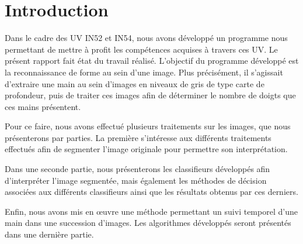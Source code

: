 \section*{Introduction}
Dans le cadre des UV IN52 et IN54, nous avons développé un programme nous permettant de mettre à profit les compétences acquises à travers ces UV. Le présent rapport fait état du travail réalisé. L'objectif du programme développé est la reconnaissance de forme au sein d'une image. Plus précisément, il s'agissait d'extraire une main au sein d'images en niveaux de gris de type carte de profondeur, puis de traiter ces images afin de déterminer le nombre de doigts que ces mains présentent.

Pour ce faire, nous avons effectué plusieurs traitements sur les images, que nous présenterons par parties. La première s’intéresse aux différents traitements effectués afin de segmenter l’image originale pour permettre son interprétation.

Dans une seconde partie, nous présenterons les classifieurs développés afin d’interpréter l’image segmentée, mais également les méthodes de décision associées aux différents classifieurs ainsi que les résultats obtenus par ces derniers.

Enfin, nous avons mis en œuvre une méthode permettant un suivi temporel d’une main dans une succession d’images. Les algorithmes développés seront présentés dans une dernière partie.